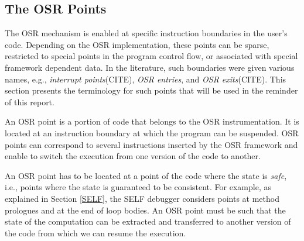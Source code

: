 \subsection{The OSR Points}
The OSR mechanism is enabled at specific instruction boundaries in the user's code.
Depending on the OSR implementation, these points can be sparse, restricted to special points in the program control flow, or associated with special framework dependent data.
In the literature, such boundaries were given various names, e.g., \textit{interrupt points}(CITE), \textit{OSR entries}, and \textit{OSR exits}(CITE).
This section presents the terminology for such points that will be used in the reminder of this report.

\begin{definition}\label{OSRPointDefinition}
An OSR point is a portion of code that belongs to the OSR instrumentation.
It is located at an instruction boundary at which the program can be suspended.
OSR points can correspond to several instructions inserted by the OSR framework and enable to switch the execution from one version of the code to another.
\end{definition}

An OSR point has to be located at a point of the code where the state is \textit{safe}, i.e., points where the state is guaranteed to be consistent.
For example, as explained in Section \ref{SELF}, the SELF debugger considers points at method prologues and at the end of loop bodies.
An OSR point must be such that the state of the computation can be extracted and transferred to another version of the code from which we can resume the execution.\\

